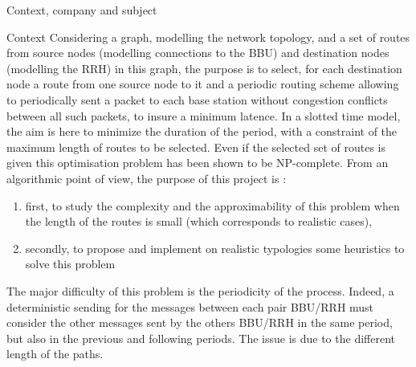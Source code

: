 \documentclass[a4paper,10pt]{report}
\begin{document}
\begin{chapter}{Context, company and subject}
\begin{section}{Context}
Considering a graph, modelling the network topology, and a set of routes from source nodes (modelling connections to the BBU) and destination 
nodes (modelling the RRH) in this graph, the purpose is to select, for each destination node a route from one source node to it and a periodic 
routing scheme allowing to periodically sent a packet to each base station without congestion conflicts between all such packets, to insure a minimum
latence. In a slotted time model, the aim is here to minimize the duration of the period, with a constraint of the maximum length of routes to be
selected. Even if the selected set of routes is given this optimisation problem has been shown to be NP-complete. From an algorithmic point of view,
the purpose of this project is :
\begin{enumerate}
 \item first, to study the complexity and the approximability of this problem when the length of the routes is small
(which corresponds to realistic cases),
\item secondly, to propose and implement on realistic typologies some 
heuristics to solve this problem
\end{enumerate}

The major difficulty of this problem is the periodicity of the process. Indeed, a deterministic sending for the messages
between each pair BBU/RRH must consider the other messages sent by the others BBU/RRH in the same period, but also in the previous
and following periods. The issue is due to the different length of the paths.
\end{section}

\end{chapter}
\end{document}
